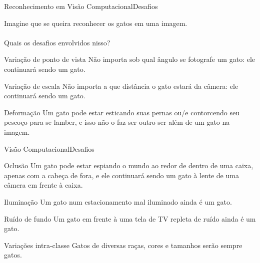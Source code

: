 \documentclass{beamer}
\begin{document}
    \begin{frame}{Reconhecimento em Visão Computacional}{Desafios}
        
        Imagine que se queira reconhecer os gatos em uma imagem.
        \\~\\
        Quais os desafios envolvidos nisso?

        \pause
    
        \begin{alertblock}{Variação de ponto de vista}
            Não importa sob qual ângulo se fotografe um gato:
            ele continuará sendo um gato.
        \end{alertblock}

        \begin{alertblock}{Variação de escala}
            Não importa a que distância o gato estará da câmera:
            ele continuará sendo um gato.
        \end{alertblock}

        \begin{alertblock}{Deformação}
            Um gato pode estar esticando suas pernas ou/e contorcendo
            seu pescoço para se lamber, e isso não o faz ser
            outro ser além de um gato na imagem.
        \end{alertblock}

    \end{frame}

    \begin{frame}{Visão Computacional}{Desafios}

        \begin{alertblock}{Oclusão}
            Um gato pode estar espiando o mundo ao redor de dentro de uma
            caixa, apenas com a cabeça de fora, e ele continuará sendo um gato à lente de uma câmera
            em frente à caixa.
        \end{alertblock}

        \begin{alertblock}{Iluminação}
            Um gato num estacionamento mal iluminado ainda é um gato.
        \end{alertblock}

        \begin{alertblock}{Ruído de fundo}
            Um gato em frente à uma tela de TV repleta de ruído
            ainda é um gato.
        \end{alertblock}

        \begin{alertblock}{Variações intra-classe}
            Gatos de diversas raças, cores e tamanhos serão
            sempre gatos.
        \end{alertblock}
    \end{frame}
\end{document}
